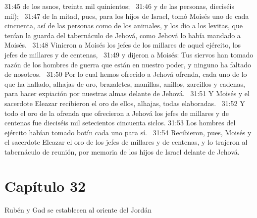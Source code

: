 31:45 de los asnos, treinta mil quinientos;  
31:46 y de las personas, dieciséis mil);  
31:47 de la mitad, pues, para los hijos de Israel, tomó Moisés uno de cada cincuenta, así de las personas como de los animales, y los dio a los levitas, que tenían la guarda del tabernáculo de Jehová, como Jehová lo había mandado a Moisés.  
31:48 Vinieron a Moisés los jefes de los millares de aquel ejército, los jefes de millares y de centenas,  
31:49 y dijeron a Moisés: Tus siervos han tomado razón de los hombres de guerra que están en nuestro poder, y ninguno ha faltado de nosotros.  
31:50 Por lo cual hemos ofrecido a Jehová ofrenda, cada uno de lo que ha hallado, alhajas de oro, brazaletes, manillas, anillos, zarcillos y cadenas, para hacer expiación por nuestras almas delante de Jehová.  
31:51 Y Moisés y el sacerdote Eleazar recibieron el oro de ellos, alhajas, todas elaboradas.  
31:52 Y todo el oro de la ofrenda que ofrecieron a Jehová los jefes de millares y de centenas fue dieciséis mil setecientos cincuenta siclos. 
31:53 Los hombres del ejército habían tomado botín cada uno para sí.  
31:54 Recibieron, pues, Moisés y el sacerdote Eleazar el oro de los jefes de millares y de centenas, y lo trajeron al tabernáculo de reunión, por memoria de los hijos de Israel delante de Jehová.  
\section*{Capítulo 32 }
Rubén y Gad se establecen al oriente del Jordán   

